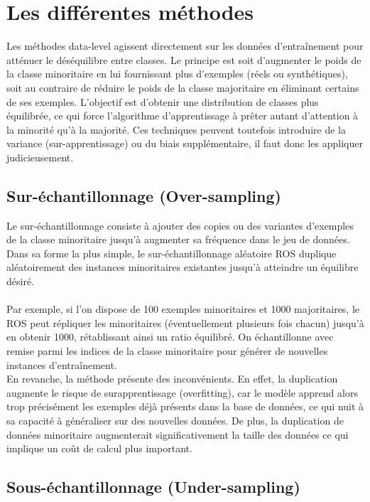 \documentclass{article}
\begin{document}
\section{Les différentes méthodes}

Les méthodes data-level agissent directement sur les données d’entraînement pour atténuer le
déséquilibre entre classes. Le principe est soit d’augmenter le poids de la classe minoritaire en lui
fournissant plus d’exemples (réels ou synthétiques), soit au contraire de réduire le poids de la classe
majoritaire en éliminant certains de ses exemples. L’objectif est d’obtenir une distribution de classes
plus équilibrée, ce qui force l’algorithme d’apprentissage à prêter autant d’attention à la minorité qu’à la
majorité. Ces techniques peuvent toutefois introduire de la variance (sur-apprentissage) ou du
biais supplémentaire, il faut donc les appliquer judicieusement.

\subsection{Sur-échantillonnage (Over-sampling)}

Le sur-échantillonnage consiste à ajouter des copies ou des variantes d'exemples de
la classe minoritaire jusqu’à augmenter sa fréquence dans le jeu de données. Dans sa forme la plus
simple, le sur-échantillonnage aléatoire ROS duplique aléatoirement des
instances minoritaires existantes jusqu’à atteindre un équilibre désiré.
\\
\\
Par exemple, si l’on dispose
de 100 exemples minoritaires et 1000 majoritaires, le ROS peut répliquer les minoritaires
(éventuellement plusieurs fois chacun) jusqu’à en obtenir 1000, rétablissant ainsi un ratio équilibré. On échantillonne avec remise parmi les indices de la classe minoritaire pour
générer de nouvelles instances d’entraînement.
\\

En revanche, la méthode présente des inconvénients. En effet, la duplication augmente le risque de surapprentissage (overfitting), car le modèle apprend alors trop précisément les exemples déjà présents dans la base de données, ce qui nuit à sa capacité à généraliser sur des nouvelles données.
De plus, la duplication de données minoritaire augmenterait significativement la taille des données ce qui implique un coût de calcul plus important.


\subsection{Sous-échantillonnage (Under-sampling)}
\end{document}
